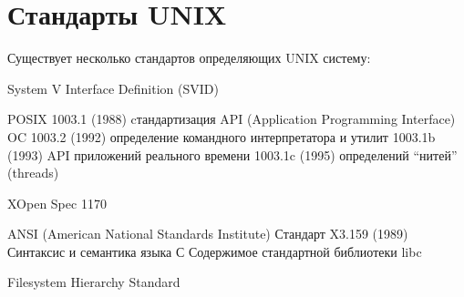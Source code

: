 \chapter{Стандарты UNIX}

Существует несколько стандартов определяющих UNIX систему:

System V Interface Definition (SVID)

POSIX
    1003.1 (1988) cтандартизация API (Application Programming Interface) OC
    1003.2 (1992) определение командного интерпретатора и утилит
    1003.1b (1993) API приложений реального времени
    1003.1c (1995) определений “нитей” (threads)


XOpen
Spec 1170

ANSI (American National Standards Institute)
    Стандарт X3.159 (1989)
    Синтаксис и семантика языка С
    Содержимое стандартной библиотеки libc

Filesystem Hierarchy Standard
